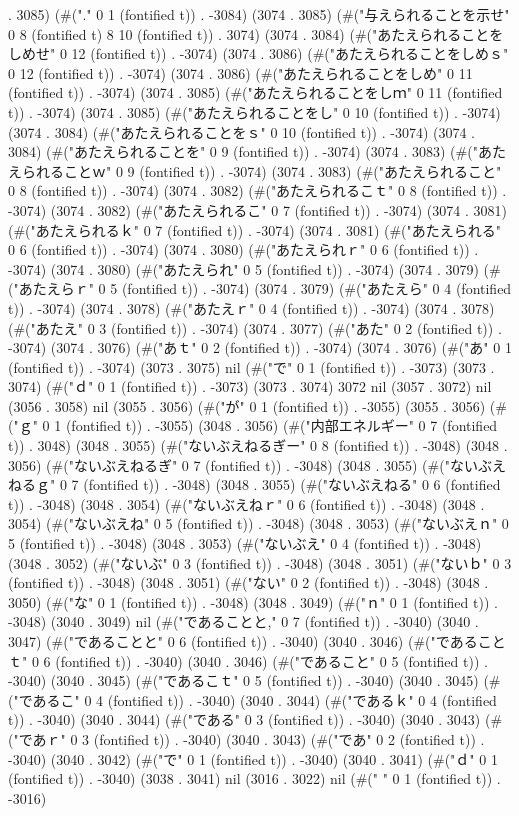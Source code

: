 {. 3085) (#("." 0 1 (fontified t)) . -3084) (3074 . 3085) (#("与えられることを示せ" 0 8 (fontified t) 8 10 (fontified t)) . 3074) (3074 . 3084) (#("あたえられることをしめせ" 0 12 (fontified t)) . -3074) (3074 . 3086) (#("あたえられることをしめｓ" 0 12 (fontified t)) . -3074) (3074 . 3086) (#("あたえられることをしめ" 0 11 (fontified t)) . -3074) (3074 . 3085) (#("あたえられることをしｍ" 0 11 (fontified t)) . -3074) (3074 . 3085) (#("あたえられることをし" 0 10 (fontified t)) . -3074) (3074 . 3084) (#("あたえられることをｓ" 0 10 (fontified t)) . -3074) (3074 . 3084) (#("あたえられることを" 0 9 (fontified t)) . -3074) (3074 . 3083) (#("あたえられることｗ" 0 9 (fontified t)) . -3074) (3074 . 3083) (#("あたえられること" 0 8 (fontified t)) . -3074) (3074 . 3082) (#("あたえられるこｔ" 0 8 (fontified t)) . -3074) (3074 . 3082) (#("あたえられるこ" 0 7 (fontified t)) . -3074) (3074 . 3081) (#("あたえられるｋ" 0 7 (fontified t)) . -3074) (3074 . 3081) (#("あたえられる" 0 6 (fontified t)) . -3074) (3074 . 3080) (#("あたえられｒ" 0 6 (fontified t)) . -3074) (3074 . 3080) (#("あたえられ" 0 5 (fontified t)) . -3074) (3074 . 3079) (#("あたえらｒ" 0 5 (fontified t)) . -3074) (3074 . 3079) (#("あたえら" 0 4 (fontified t)) . -3074) (3074 . 3078) (#("あたえｒ" 0 4 (fontified t)) . -3074) (3074 . 3078) (#("あたえ" 0 3 (fontified t)) . -3074) (3074 . 3077) (#("あた" 0 2 (fontified t)) . -3074) (3074 . 3076) (#("あｔ" 0 2 (fontified t)) . -3074) (3074 . 3076) (#("あ" 0 1 (fontified t)) . -3074) (3073 . 3075) nil (#("で" 0 1 (fontified t)) . -3073) (3073 . 3074) (#("ｄ" 0 1 (fontified t)) . -3073) (3073 . 3074) 3072 nil (3057 . 3072) nil (3056 . 3058) nil (3055 . 3056) (#("が" 0 1 (fontified t)) . -3055) (3055 . 3056) (#("ｇ" 0 1 (fontified t)) . -3055) (3048 . 3056) (#("内部エネルギー" 0 7 (fontified t)) . 3048) (3048 . 3055) (#("ないぶえねるぎー" 0 8 (fontified t)) . -3048) (3048 . 3056) (#("ないぶえねるぎ" 0 7 (fontified t)) . -3048) (3048 . 3055) (#("ないぶえねるｇ" 0 7 (fontified t)) . -3048) (3048 . 3055) (#("ないぶえねる" 0 6 (fontified t)) . -3048) (3048 . 3054) (#("ないぶえねｒ" 0 6 (fontified t)) . -3048) (3048 . 3054) (#("ないぶえね" 0 5 (fontified t)) . -3048) (3048 . 3053) (#("ないぶえｎ" 0 5 (fontified t)) . -3048) (3048 . 3053) (#("ないぶえ" 0 4 (fontified t)) . -3048) (3048 . 3052) (#("ないぶ" 0 3 (fontified t)) . -3048) (3048 . 3051) (#("ないｂ" 0 3 (fontified t)) . -3048) (3048 . 3051) (#("ない" 0 2 (fontified t)) . -3048) (3048 . 3050) (#("な" 0 1 (fontified t)) . -3048) (3048 . 3049) (#("ｎ" 0 1 (fontified t)) . -3048) (3040 . 3049) nil (#("であることと," 0 7 (fontified t)) . -3040) (3040 . 3047) (#("であることと" 0 6 (fontified t)) . -3040) (3040 . 3046) (#("であることｔ" 0 6 (fontified t)) . -3040) (3040 . 3046) (#("であること" 0 5 (fontified t)) . -3040) (3040 . 3045) (#("であるこｔ" 0 5 (fontified t)) . -3040) (3040 . 3045) (#("であるこ" 0 4 (fontified t)) . -3040) (3040 . 3044) (#("であるｋ" 0 4 (fontified t)) . -3040) (3040 . 3044) (#("である" 0 3 (fontified t)) . -3040) (3040 . 3043) (#("であｒ" 0 3 (fontified t)) . -3040) (3040 . 3043) (#("であ" 0 2 (fontified t)) . -3040) (3040 . 3042) (#("で" 0 1 (fontified t)) . -3040) (3040 . 3041) (#("ｄ" 0 1 (fontified t)) . -3040) (3038 . 3041) nil (3016 . 3022) nil (#(" " 0 1 (fontified t)) . -3016) }
